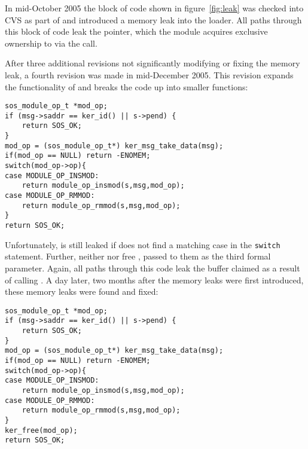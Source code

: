 In mid-October 2005 the block of code shown in figure~\ref{fig:leak} was
checked into CVS as part of  and introduced a memory leak into
the loader.  
%
All paths through this block of code leak the  pointer, which
the module acquires exclusive ownership to via the 
call.  



After three additional revisions not significantly modifying or fixing the
memory leak, a fourth revision was made in mid-December 2005.  
%
This revision expands the functionality of  and breaks the code
up into smaller functions:



\begin{footnotesize}
\begin{verbatim}
sos_module_op_t *mod_op;
if (msg->saddr == ker_id() || s->pend) {
    return SOS_OK;
}
mod_op = (sos_module_op_t*) ker_msg_take_data(msg);
if(mod_op == NULL) return -ENOMEM;
switch(mod_op->op){
case MODULE_OP_INSMOD:
    return module_op_insmod(s,msg,mod_op);
case MODULE_OP_RMMOD:
    return module_op_rmmod(s,msg,mod_op);
}
return SOS_OK;
\end{verbatim}
\end{footnotesize}



Unfortunately,  is still leaked if  does not
find a matching case in the {\tt switch} statement.
%
Further, neither  nor  free
, passed to them as the third formal parameter.
%
Again, all paths through this code leak the buffer claimed as a result of
calling .
%
A day later, two months after the memory leaks were first introduced, these
memory leaks were found and fixed:



\begin{footnotesize}
\begin{verbatim}
sos_module_op_t *mod_op;
if (msg->saddr == ker_id() || s->pend) {
    return SOS_OK;
}
mod_op = (sos_module_op_t*) ker_msg_take_data(msg);
if(mod_op == NULL) return -ENOMEM;
switch(mod_op->op){
case MODULE_OP_INSMOD:
    return module_op_insmod(s,msg,mod_op);
case MODULE_OP_RMMOD:
    return module_op_rmmod(s,msg,mod_op);
}
ker_free(mod_op);
return SOS_OK;
\end{verbatim}
\end{footnotesize}



